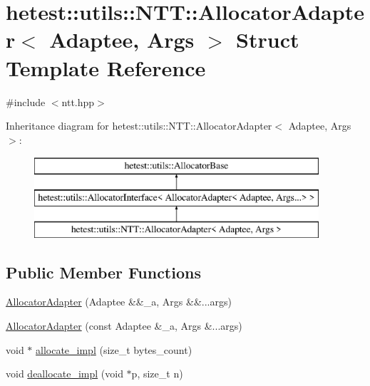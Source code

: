 \hypertarget{structhetest_1_1utils_1_1NTT_1_1AllocatorAdapter}{\section{hetest\-:\-:utils\-:\-:N\-T\-T\-:\-:Allocator\-Adapter$<$ Adaptee, Args $>$ Struct Template Reference}
\label{structhetest_1_1utils_1_1NTT_1_1AllocatorAdapter}
}


{\ttfamily \#include $<$ntt.\-hpp$>$}

Inheritance diagram for hetest\-:\-:utils\-:\-:N\-T\-T\-:\-:Allocator\-Adapter$<$ Adaptee, Args $>$\-:\begin{figure}[H]
\begin{center}
\leavevmode
\includegraphics[height=3.000000cm]{structhetest_1_1utils_1_1NTT_1_1AllocatorAdapter}
\end{center}
\end{figure}
\subsection*{Public Member Functions}
\begin{DoxyCompactItemize}
\item 
\hyperlink{structhetest_1_1utils_1_1NTT_1_1AllocatorAdapter_acfe475e3767d7de45ae655e54d0846f0}{Allocator\-Adapter} (Adaptee \&\&\-\_\-a, Args \&\&...args)
\item 
\hyperlink{structhetest_1_1utils_1_1NTT_1_1AllocatorAdapter_a55c62e85f11443da9e79a0718a18ee2f}{Allocator\-Adapter} (const Adaptee \&\-\_\-a, Args \&...args)
\item 
void $\ast$ \hyperlink{structhetest_1_1utils_1_1NTT_1_1AllocatorAdapter_ac6b6542850337717e478d78477d89e6e}{allocate\-\_\-impl} (size\-\_\-t bytes\-\_\-count)
\item 
void \hyperlink{structhetest_1_1utils_1_1NTT_1_1AllocatorAdapter_af3dc9adfd717dc77aaa973e37642c4a6}{deallocate\-\_\-impl} (void $\ast$p, size\-\_\-t n)
\end{DoxyCompactItemize}


